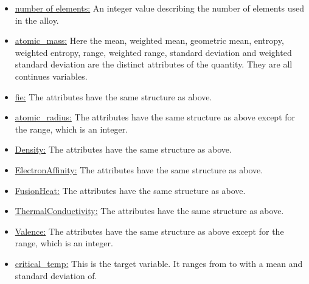 \documentclass{article}[a4paper,12pt]
\begin{document}
\begin{itemize}
    \item \underline{number of elements:} An integer value describing the number of elements used in the alloy.
    \item \underline{atomic\_mass:} Here the mean, weighted mean, geometric mean, entropy, weighted entropy, range, weighted range, standard deviation and weighted standard deviation are the distinct attributes of the quantity. They are all continues variables. 
    \item \underline{fie:} The attributes have the same structure as above.
    \item \underline{atomic\_radius:} The attributes have the same structure as above except for the range, which is an integer.
    \item \underline{Density:} The attributes have the same structure as above.
    \item \underline{ElectronAffinity:} The attributes have the same structure as above.
    \item \underline{FusionHeat:} The attributes have the same structure as above.
    \item \underline{ThermalConductivity:} The attributes have the same structure as above.
    \item \underline{Valence:} The attributes have the same structure as above except for the range, which is an integer.
    \item \underline{critical\_temp:} This is the target variable. It ranges from to with a mean and standard deviation of.
\end{itemize}
\end{document}
